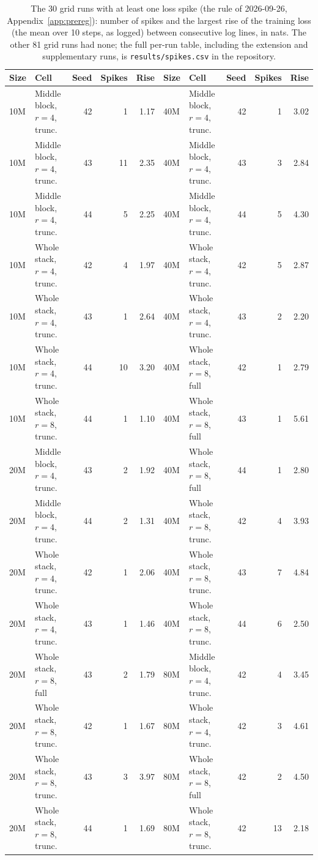 \begin{table}[h]
  \centering
  \caption{The 30 grid runs with at least one loss spike (the rule of 2026-09-26, Appendix~\ref{app:prereg}): number of
  spikes and the largest rise of the training loss (the mean over 10 steps, as logged) between consecutive log lines, in
  nats. The other 81 grid runs had none; the full
  per-run table, including the extension and supplementary runs, is \texttt{results/spikes.csv} in the repository.}
  \label{tab:spikes}
  \footnotesize
  \setlength{\tabcolsep}{3pt}
  \begin{tabular}{llrrr@{\hspace{1.5em}}llrrr}
    \toprule
    Size & Cell & Seed & Spikes & Rise & Size & Cell & Seed & Spikes & Rise \\
    \midrule
    10M & Middle block, $r=4$, trunc. & 42 & 1 & 1.17 & 40M & Middle block, $r=4$, trunc. & 42 & 1 & 3.02 \\
    10M & Middle block, $r=4$, trunc. & 43 & 11 & 2.35 & 40M & Middle block, $r=4$, trunc. & 43 & 3 & 2.84 \\
    10M & Middle block, $r=4$, trunc. & 44 & 5 & 2.25 & 40M & Middle block, $r=4$, trunc. & 44 & 5 & 4.30 \\
    10M & Whole stack, $r=4$, trunc. & 42 & 4 & 1.97 & 40M & Whole stack, $r=4$, trunc. & 42 & 5 & 2.87 \\
    10M & Whole stack, $r=4$, trunc. & 43 & 1 & 2.64 & 40M & Whole stack, $r=4$, trunc. & 43 & 2 & 2.20 \\
    10M & Whole stack, $r=4$, trunc. & 44 & 10 & 3.20 & 40M & Whole stack, $r=8$, full & 42 & 1 & 2.79 \\
    10M & Whole stack, $r=8$, trunc. & 44 & 1 & 1.10 & 40M & Whole stack, $r=8$, full & 43 & 1 & 5.61 \\
    20M & Middle block, $r=4$, trunc. & 43 & 2 & 1.92 & 40M & Whole stack, $r=8$, full & 44 & 1 & 2.80 \\
    20M & Middle block, $r=4$, trunc. & 44 & 2 & 1.31 & 40M & Whole stack, $r=8$, trunc. & 42 & 4 & 3.93 \\
    20M & Whole stack, $r=4$, trunc. & 42 & 1 & 2.06 & 40M & Whole stack, $r=8$, trunc. & 43 & 7 & 4.84 \\
    20M & Whole stack, $r=4$, trunc. & 43 & 1 & 1.46 & 40M & Whole stack, $r=8$, trunc. & 44 & 6 & 2.50 \\
    20M & Whole stack, $r=8$, full & 43 & 2 & 1.79 & 80M & Middle block, $r=4$, trunc. & 42 & 4 & 3.45 \\
    20M & Whole stack, $r=8$, trunc. & 42 & 1 & 1.67 & 80M & Whole stack, $r=4$, trunc. & 42 & 3 & 4.61 \\
    20M & Whole stack, $r=8$, trunc. & 43 & 3 & 3.97 & 80M & Whole stack, $r=8$, full & 42 & 2 & 4.50 \\
    20M & Whole stack, $r=8$, trunc. & 44 & 1 & 1.69 & 80M & Whole stack, $r=8$, trunc. & 42 & 13 & 2.18 \\
    \bottomrule
  \end{tabular}
\end{table}

